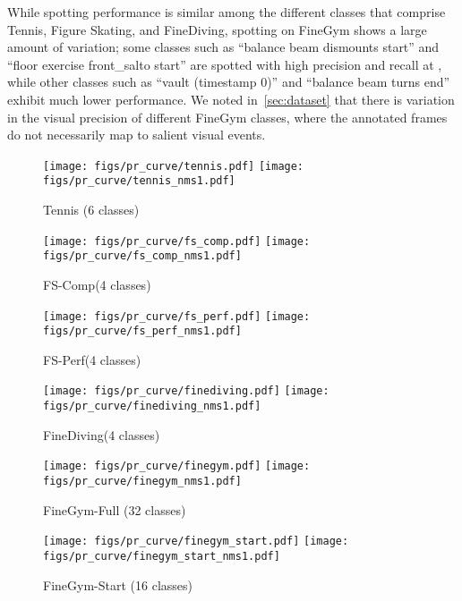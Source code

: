 \documentclass[runningheads]{llncs}
\newcommand{\fscomp}{{FS-Comp}\xspace}
\newcommand{\fsperf}{{FS-Perf}\xspace}
\newcommand{\finegym}{{FineGym}\xspace}
\newcommand{\finediving}{{FineDiving}\xspace}
\begin{document}
While spotting performance is similar among the different classes that comprise Tennis, Figure Skating, and \finediving,
spotting on \finegym shows a large amount of variation; some classes such as
``balance beam dismounts start'' and ``floor exercise front\_salto start''
are spotted with high precision and recall at , while other classes such as ``vault (timestamp 0)'' and ``balance beam turns end'' exhibit much lower performance.
We noted in~\autoref{sec:dataset} that there is variation in the visual precision of different \finegym classes, where the annotated frames do not necessarily map to salient visual events.

\begin{figure*}[p]
    \centering
    \begin{subfigure}{\textwidth}
        \centering
        \texttt{[image: figs/pr\_curve/tennis.pdf]}
        \texttt{[image: figs/pr\_curve/tennis\_nms1.pdf]}
        \vspace{-1em}
        \caption{Tennis (6 classes)}
    \end{subfigure}
    \begin{subfigure}{\textwidth}
        \centering
        \texttt{[image: figs/pr\_curve/fs\_comp.pdf]}
        \texttt{[image: figs/pr\_curve/fs\_comp\_nms1.pdf]}
        \vspace{-1em}
        \caption{\fscomp (4 classes)}
    \end{subfigure}
    \begin{subfigure}{\textwidth}
        \centering
        \texttt{[image: figs/pr\_curve/fs\_perf.pdf]}
        \texttt{[image: figs/pr\_curve/fs\_perf\_nms1.pdf]}
        \vspace{-1em}
        \caption{\fsperf (4 classes)}
    \end{subfigure}
    \begin{subfigure}{\textwidth}
        \centering
        \texttt{[image: figs/pr\_curve/finediving.pdf]}
        \texttt{[image: figs/pr\_curve/finediving\_nms1.pdf]}
        \vspace{-1em}
        \caption{\finediving (4 classes)}
    \end{subfigure}
    \begin{subfigure}{\textwidth}
        \centering
        \texttt{[image: figs/pr\_curve/finegym.pdf]}
        \texttt{[image: figs/pr\_curve/finegym\_nms1.pdf]}
        \vspace{-1em}
        \caption{\finegym-Full (32 classes)}
    \end{subfigure}
    \begin{subfigure}{\textwidth}
        \centering
        \texttt{[image: figs/pr\_curve/finegym\_start.pdf]}
        \texttt{[image: figs/pr\_curve/finegym\_start\_nms1.pdf]}
        \vspace{-1em}
        \caption{\finegym-Start (16 classes)}
    \end{subfigure}


\end{figure*}
\end{document}
